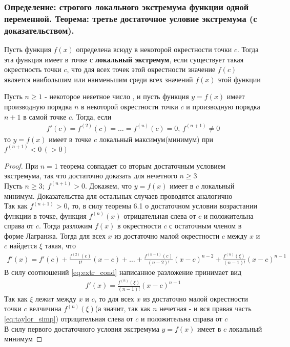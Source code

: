 \documentclass[10pt]{article}
\begin{document}
    \subsubsection{Определение: строгого локального экстремума функции одной переменной. Теорема: третье достаточное условие экстремума (с доказательством).}
    \begin{definition}
        Пусть функция $f(x)$ определена всюду в некоторой окрестности точки $c$. Тогда эта функция имеет в точке с \textbf{локальный экстремум}, если существует такая окрестность точки $c$, что для всех точек этой окрестности значение $f(c)$ является наибольшим или наименьшим среди всех значений $f(x)$ этой функции
    \end{definition}
    \begin{theorem}
        Пусть $n \geq 1$ - некоторое неяетное число , и пусть функция $y = f(x)$ имеет производную порядка $n$ в некоторой окрестности точки $c$ и производную порядка $n+1$ в самой точке $c$. Тогда, если
        \begin{gather}
            f'(c) = f^{(2)}(c) = \ldots = f^{(n)}(c) = 0,\, f^{(n+1)} \neq 0 \label{eq:extr_cond}
        \end{gather}
        то $y = f(x)$ имеет в точке $c$ локальный максимум(минимум) при $f^{(n+1)} < 0\,(>0)$
    \end{theorem}
    \begin{proof}
        При $n = 1$ теорема совпадает со вторым достаточным условием экстремума, так что достаточно доказать для нечетного $n \geq 3$ \\
        Пусть $n \geq 3;\; f^{(n+1)} > 0$. Докажем, что $y = f(x)$ имеет в $c$ локальный минимум. Доказательства для остальных случаев проводятся аналогично\\
        Так как $f^{(n+1)} > 0$, то, в силу теоремы 6.1 о достаточном условии возрастании функции в точке, функция $f^{(n)}(x)$ отрицательная слева от $c$ и положительна справа от $c$. Тогда разложим $f(x)$ в окрестности $c$ с остаточным членом в форме Лагранжа. Тогда для всех $x$ из достаточно малой окрестности $c$ между $x$ и $c$ найдется $\xi$ такая, что
        \begin{gather*}
            f'(x) = f'(c)+\frac{f^{(2)}(c)}{1!}(x-c) + \ldots + \frac{f^{(n-1)}(c)}{(n-2)!}(x-c)^{n-2} + \frac{f^{(n)}(\xi)}{(n-1)!}(x-c)^{n-1}
        \end{gather*}
        В силу соотношений \ref{eq:extr_cond} написанное разложение принимает вид
        \begin{gather}
            f'(x) = \frac{f^{(n)}(\xi)}{(n-1)!} (x-c)^{n-1} \label{eq:taylor_simp}
        \end{gather}
        Так как $\xi$ лежит между $x$ и $c$, то для всех $x$ из достаточно малой окрестности точки $c$ велчичина $f^{(n)}(\xi)$(а значит, так как $n$ нечетная - и вся правая часть \ref{eq:taylor_simp}) отрицательная слева от $c$ и положительна справа от $c$\\
        В силу первого достаточного условия экстремума $y = f(x)$ имеет в $c$ локальный минимум 
    \end{proof}
\end{document}

